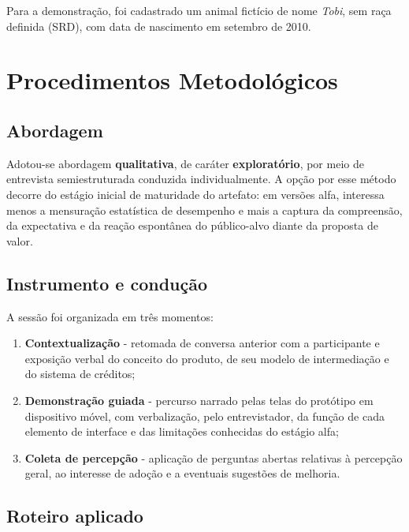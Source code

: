 \documentclass[12pt,a4paper]{article}
\begin{document}
Para a demonstração, foi cadastrado um animal fictício de nome \textit{Tobi}, sem raça
definida (SRD), com data de nascimento em setembro de 2010.

\section{Procedimentos Metodológicos}

\subsection{Abordagem}

Adotou-se abordagem \textbf{qualitativa}, de caráter \textbf{exploratório}, por meio de
entrevista semiestruturada conduzida individualmente. A opção por esse método decorre do
estágio inicial de maturidade do artefato: em versões alfa, interessa menos a mensuração
estatística de desempenho e mais a captura da compreensão, da expectativa e da reação
espontânea do público-alvo diante da proposta de valor.

\subsection{Instrumento e condução}

A sessão foi organizada em três momentos:

\begin{enumerate}[label=\textbf{\arabic*.}]
  \item \textbf{Contextualização} - retomada de conversa anterior com a participante e
        exposição verbal do conceito do produto, de seu modelo de intermediação e do sistema
        de créditos;
  \item \textbf{Demonstração guiada} - percurso narrado pelas telas do protótipo em
        dispositivo móvel, com verbalização, pelo entrevistador, da função de cada elemento
        de interface e das limitações conhecidas do estágio alfa;
  \item \textbf{Coleta de percepção} - aplicação de perguntas abertas relativas à percepção
        geral, ao interesse de adoção e a eventuais sugestões de melhoria.
\end{enumerate}

\subsection{Roteiro aplicado}
\end{document}
